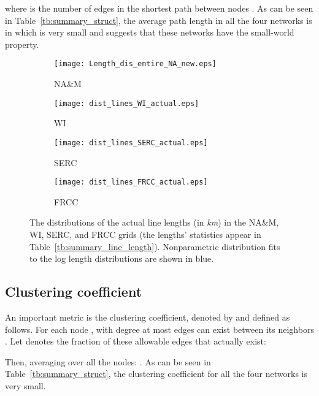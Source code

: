 \documentclass[10pt,journal]{IEEEtran}
\begin{document}
where  is the number of edges in the shortest path between nodes . As can be seen in Table~\ref{tb:summary_struct}, the average path length in all the four networks is in  which is very small and suggests that these networks have the small-world property.


\begin{figure*}[t]
\centering
\begin{subfigure}[b]{0.24\textwidth}
\vspace*{-0.2cm}
\texttt{[image: Length\_dis\_entire\_NA\_new.eps]}
\vspace*{-0.2cm}
\caption{NA\&M}
\end{subfigure}
\begin{subfigure}[b]{0.24\textwidth}
\vspace*{-0.2cm}
\texttt{[image: dist\_lines\_WI\_actual.eps]}
\vspace*{-0.2cm}
\caption{WI}
\end{subfigure}
\begin{subfigure}[b]{0.24\textwidth}
\vspace*{-0.2cm}
\texttt{[image: dist\_lines\_SERC\_actual.eps]}
\vspace*{-0.2cm}
\caption{SERC}
\end{subfigure}
\begin{subfigure}[b]{0.24\textwidth}
\vspace*{-0.2cm}
\texttt{[image: dist\_lines\_FRCC\_actual.eps]}
\vspace*{-0.2cm}
\caption{FRCC}
\end{subfigure}
\caption{The distributions of the actual line lengths (in \emph{km}) in the NA\&M, WI, SERC, and FRCC grids (the lengths' statistics appear in Table~\ref{tb:summary_line_length}). Nonparametric distribution fits to the log length distributions are shown in blue.}
\label{fig:dist_lines_WI}
\vspace*{0.2cm}
\end{figure*}

\subsection{Clustering coefficient}
An important metric is the clustering coefficient, denoted by  and defined as follows. For each node , with degree  at most  edges can exist
between its neighbors . Let  denotes the fraction of these allowable edges that actually exist:

Then, averaging  over all the nodes: .
As can be seen in Table~\ref{tb:summary_struct}, the clustering coefficient for all the four networks is very small.
\end{document}
